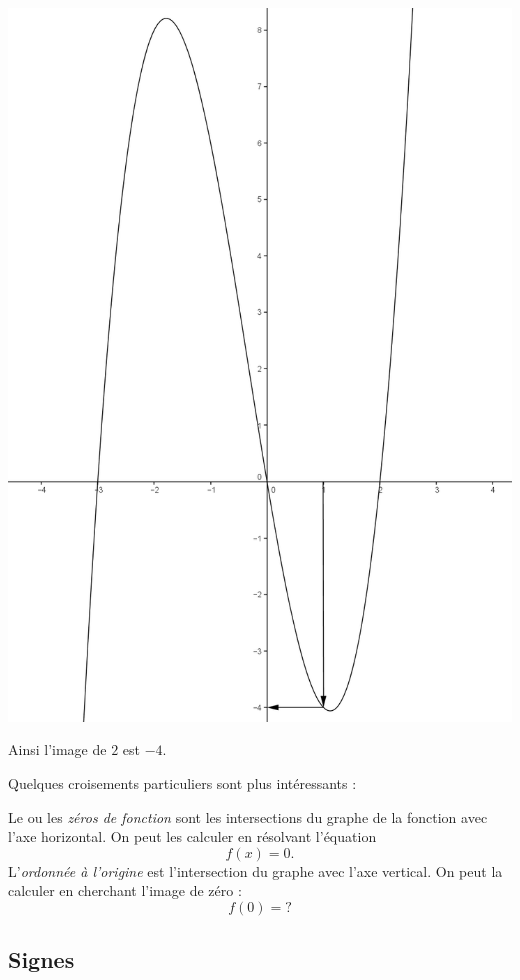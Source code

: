 \begin{exemple}
\begin{center}
\includegraphics{affines/fct_graphe_sol.png}
\end{center}
Ainsi l'image de $2$ est $-4$.
\end{exemple}

Quelques croisements particuliers sont plus intéressants :
\begin{definition}
Le ou les \emph{zéros de fonction} sont les intersections du graphe de la fonction avec l'axe horizontal. On peut les calculer en résolvant l'équation
$$
f(x) = 0.
$$
L'\emph{ordonnée à l'origine} est l'intersection du graphe avec l'axe vertical. On peut la calculer en cherchant l'image de zéro :
$$
f(0) = ?
$$
\end{definition}

\subsection{Signes}


